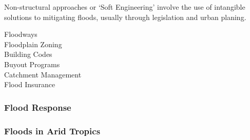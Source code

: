 \documentclass[../../main]{subfiles}
\begin{document}
	Non-structural approaches or `Soft Engineering' involve the use of intangible solutions to mitigating floods, usually through legislation and urban planing.

	\begin{description}
		\item[Floodways]

		
		\item[Floodplain Zoning]
		\item[Building Codes]
		\item[Buyout Programs]
		\item[Catchment Management]
		\item[Flood Insurance]
	\end{description}

\subsubsection{Flood Response}

\subsubsection{Floods in Arid Tropics}
\end{document}
